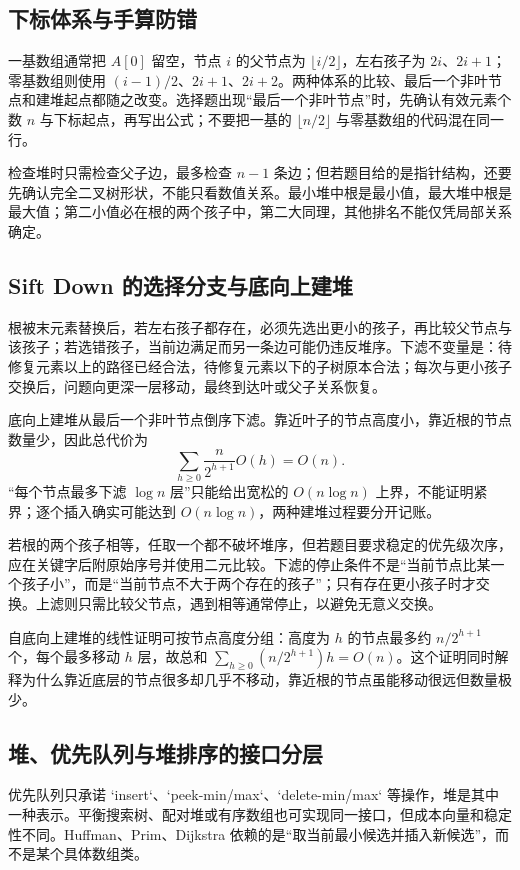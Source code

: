 \documentclass[UTF8,fontset=none,11pt,a4paper]{ctexart}
\begin{document}
\subsection{下标体系与手算防错}
一基数组通常把 $A[0]$ 留空，节点 $i$ 的父节点为 $\lfloor i/2\rfloor$，左右孩子为 $2i$、$2i+1$；零基数组则使用 $(i-1)/2$、$2i+1$、$2i+2$。两种体系的比较、最后一个非叶节点和建堆起点都随之改变。选择题出现“最后一个非叶节点”时，先确认有效元素个数 $n$ 与下标起点，再写出公式；不要把一基的 $\lfloor n/2\rfloor$ 与零基数组的代码混在同一行。

检查堆时只需检查父子边，最多检查 $n-1$ 条边；但若题目给的是指针结构，还要先确认完全二叉树形状，不能只看数值关系。最小堆中根是最小值，最大堆中根是最大值；第二小值必在根的两个孩子中，第二大同理，其他排名不能仅凭局部关系确定。

\subsection{Sift Down 的选择分支与底向上建堆}
根被末元素替换后，若左右孩子都存在，必须先选出更小的孩子，再比较父节点与该孩子；若选错孩子，当前边满足而另一条边可能仍违反堆序。下滤不变量是：待修复元素以上的路径已经合法，待修复元素以下的子树原本合法；每次与更小孩子交换后，问题向更深一层移动，最终到达叶或父子关系恢复。

底向上建堆从最后一个非叶节点倒序下滤。靠近叶子的节点高度小，靠近根的节点数量少，因此总代价为
\[
\sum_{h\ge0}\frac{n}{2^{h+1}}O(h)=O(n).
\]
“每个节点最多下滤 $\log n$ 层”只能给出宽松的 $O(n\log n)$ 上界，不能证明紧界；逐个插入确实可能达到 $O(n\log n)$，两种建堆过程要分开记账。

若根的两个孩子相等，任取一个都不破坏堆序，但若题目要求稳定的优先级次序，应在关键字后附原始序号并使用二元比较。下滤的停止条件不是“当前节点比某一个孩子小”，而是“当前节点不大于两个存在的孩子”；只有存在更小孩子时才交换。上滤则只需比较父节点，遇到相等通常停止，以避免无意义交换。

自底向上建堆的线性证明可按节点高度分组：高度为 $h$ 的节点最多约 $n/2^{h+1}$ 个，每个最多移动 $h$ 层，故总和 $\sum_{h\ge0} (n/2^{h+1})h=O(n)$。这个证明同时解释为什么靠近底层的节点很多却几乎不移动，靠近根的节点虽能移动很远但数量极少。

\subsection{堆、优先队列与堆排序的接口分层}
优先队列只承诺 `insert`、`peek-min/max`、`delete-min/max` 等操作，堆是其中一种表示。平衡搜索树、配对堆或有序数组也可实现同一接口，但成本向量和稳定性不同。Huffman、Prim、Dijkstra 依赖的是“取当前最小候选并插入新候选”，而不是某个具体数组类。
\end{document}
